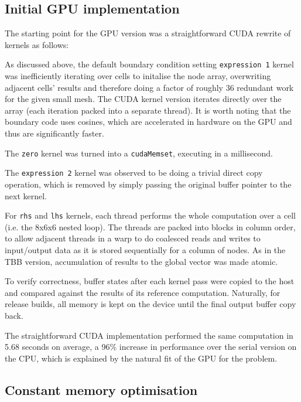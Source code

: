 \documentclass[11pt, oneside, a4paper]{article}
\begin{document}
\subsection{Initial GPU implementation} %
\label{sub:initial_implementation}
The starting point for the GPU version was a straightforward CUDA rewrite of kernels as follows:

As discussed above, the default boundary condition setting \texttt{expression 1} kernel was inefficiently iterating over cells to initalise the node array, overwriting adjacent cells' results and therefore doing a factor of roughly 36 redundant work for the given small mesh. The CUDA kernel version iterates directly over the array (each iteration packed into a separate thread). It is worth noting that the boundary code uses cosines, which are accelerated in hardware on the GPU and thus are significantly faster.

The \texttt{zero} kernel was turned into a \texttt{cudaMemset}, executing in a millisecond.

The \texttt{expression 2} kernel was observed to be doing a trivial direct copy operation, which is removed by simply passing the original buffer pointer to the next kernel.

For \texttt{rhs} and \texttt{lhs} kernels, each thread performs the whole computation over a cell (i.e. the 8x6x6 nested loop). The threads are packed into blocks in column order, to allow adjacent threads in a warp to do coalesced reads and writes to input/output data as it is stored sequentially for a column of nodes. As in the TBB version, accumulation of results to the global vector was made atomic.

To verify correctness, buffer states after each kernel pass were copied to the host and compared against the results of its reference computation. Naturally, for release builds, all memory is kept on the device until the final output buffer copy back.

The straightforward CUDA implementation performed the same computation in 5.68 seconds on average, a 96\% increase in performance over the serial version on the CPU, which is explained by the natural fit of the GPU for the problem.


\subsection{Constant memory optimisation} %
\label{sub:constant_memory_optimisation}
\end{document}
